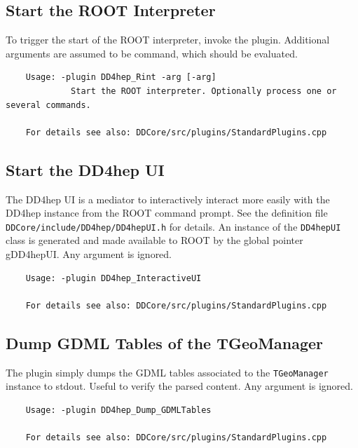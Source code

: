 \subsection{Start the ROOT Interpreter}
\label{sec:dd4hep-manual-plugin-root-interpreter}

To trigger the start of the ROOT interpreter, invoke the plugin. Additional arguments are 
assumed to be command, which should be evaluated.
\begin{verbatim}
    Usage: -plugin DD4hep_Rint -arg [-arg]                                 
             Start the ROOT interpreter. Optionally process one or several commands.

    For details see also: DDCore/src/plugins/StandardPlugins.cpp
\end{verbatim}

\subsection{Start the DD4hep UI}
\label{sec:dd4hep-manual-plugin-dd4hep-ui}

The DD4hep UI is a mediator to interactively interact more easily with the DD4hep instance from the 
ROOT command prompt. See the definition file \texttt{DDCore/include/DD4hep/DD4hepUI.h} for details.
An instance of the \texttt{DD4hepUI} class is generated and made available to ROOT by the global pointer
gDD4hepUI. Any argument is ignored.
\begin{verbatim}
    Usage: -plugin DD4hep_InteractiveUI

    For details see also: DDCore/src/plugins/StandardPlugins.cpp
\end{verbatim}

\subsection{Dump GDML Tables of the TGeoManager}
\label{sec:dd4hep-manual-plugin-dump-gdml-tables}

The plugin simply dumps the GDML tables associated to the \texttt{TGeoManager} instance to stdout.
Useful to verify the parsed content.
Any argument is ignored.
\begin{verbatim}
    Usage: -plugin DD4hep_Dump_GDMLTables

    For details see also: DDCore/src/plugins/StandardPlugins.cpp
\end{verbatim}

